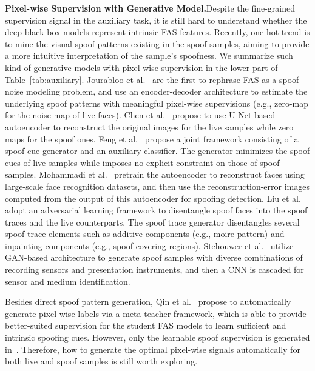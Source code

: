\documentclass[10pt,journal,compsoc]{IEEEtran}
\begin{document}
\vspace{0.4em}
\noindent\textbf{Pixel-wise Supervision with Generative Model.}\quad   Despite the fine-grained supervision signal in the auxiliary task, it is still hard to understand whether the deep black-box models represent intrinsic FAS features. Recently, one hot trend is to mine the visual spoof patterns existing in the spoof samples, aiming to provide a more intuitive interpretation of the sample’s spoofness. We summarize such kind of generative models with pixel-wise supervision in the lower part of Table~\ref{tab:auxiliary}. Jourabloo et al.~\cite{jourabloo2018face} are the first to rephrase FAS as a spoof noise modeling problem, and use an encoder-decoder architecture to estimate the underlying spoof patterns with meaningful pixel-wise supervisions (e.g.,  zero-map for the noise map of live faces). Chen et al.~\cite{chen2019towards} propose to use U-Net based autoencoder to reconstruct the original images for the live samples while zero maps for the spoof ones. Feng et al.~\cite{feng2020learning} propose a joint framework consisting of a spoof cue generator and an auxiliary classifier. The generator minimizes the spoof cues of live samples while imposes no explicit constraint on those of spoof samples. Mohammadi et al.~\cite{mohammadi2020improving} pretrain the autoencoder to reconstruct
faces using large-scale face recognition datasets, and then use the reconstruction-error images computed from the output of this autoencoder for spoofing detection. Liu et al.~\cite{liu2020disentangling,liu2020physics} adopt an adversarial learning framework to disentangle spoof faces into the spoof traces and the live counterparts. The spoof trace generator disentangles several spoof trace elements such as additive components (e.g., moire pattern) and inpainting components (e.g., spoof covering regions). Stehouwer et al.~\cite{stehouwer2020noise} utilize GAN-based architecture to generate spoof samples with diverse combinations of recording sensors and presentation instruments, and then a CNN is cascaded for sensor and medium identification.   



Besides direct spoof pattern generation, Qin et al.~\cite{qin2021meta} propose to automatically generate pixel-wise labels via a meta-teacher framework, which is able to provide better-suited supervision for the student FAS models to learn sufficient and intrinsic spoofing cues. However, only the learnable spoof supervision is generated in~\cite{qin2021meta}. Therefore, how to generate the optimal pixel-wise signals automatically for both live and spoof samples is still worth exploring.
\end{document}
